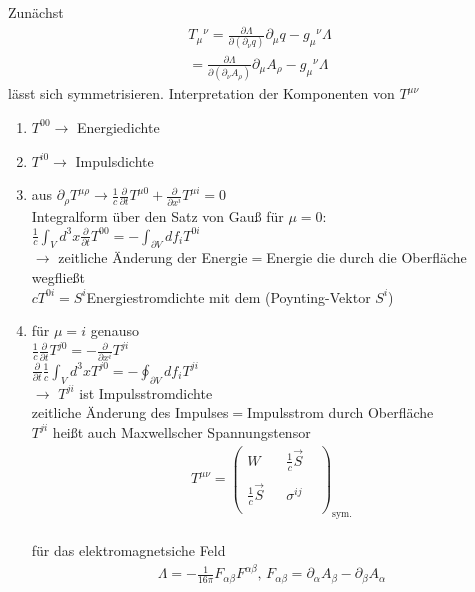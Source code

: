 \documentclass[a4paper]{article}
\begin{document}
Zunächst 
\begin{align}
T_\mu{}^\nu=\frac{\partial \Lambda}{\partial(\partial_\nu q)}\partial_\mu
q-g_\mu{}^\nu\Lambda\\
=\frac{\partial \Lambda}{\partial(\partial_\nu A_\rho)}\partial_\mu
A_\rho-g_\mu{}^\nu\Lambda
\end{align}
lässt sich symmetrisieren.
Interpretation der Komponenten von $T^{\mu\nu}$
\begin{enumerate}
  \item $T^{00} \rightarrow$ Energiedichte
  \item $T^{i0} \rightarrow$ Impulsdichte
  \item aus $\partial_\rho T^{\mu\rho} \rightarrow
  \frac{1}{c}\frac{\partial}{\partial t} T^{\mu 0}+\frac{\partial}{\partial
  x^i} T^{\mu i}=0$ \\ Integralform über den Satz von Gauß für $\mu=0$:\\
  $\frac{1}{c}\int_V d^3x \frac{\partial}{\partial t} T^{0 0}=-\int_{\partial
  V} df_i T^{0i}$ \\ $\rightarrow$ zeitliche Änderung der Energie$=$Energie die
  durch die Oberfläche wegfließt\\ $cT^{0i}=S^i$Energiestromdichte mit dem
  (Poynting-Vektor $S^i$)
  \item für $\mu=i$ genauso \\ $\frac{1}{c}\frac{\partial}{\partial t}
  T^{j0}=-\frac{\partial}{\partial x^i} T^{ji}$\\ $\frac{\partial}{\partial
  t}\frac{1}{c}\int_Vd^3x T^{j0}=-\oint_{\partial V}df_i T^{ji}$\\$\rightarrow$
  $T^{ji}$ ist Impulsstromdichte\\zeitliche Änderung des Impulses$=$Impulsstrom
  durch Oberfläche \\ $T^{ji}$ heißt auch Maxwellscher Spannungstensor
  \begin{align}
  T^{\mu\nu}=\begin{pmatrix}W&&\frac{1}{c}\vec{S}&\\&&&\\
  \frac{1}{c}\vec{S}&&\sigma^{ij}&\\&&&\end{pmatrix}_{\text{sym.}}
  \end{align}\\ für das elektromagnetsiche Feld \begin{align}
  \Lambda =-\frac{1}{16\pi}F_{\alpha\beta}F^{\alpha\beta} \text{,   }
  F_{\alpha\beta}=\partial_\alpha A_\beta-\partial_\beta A_\alpha \\

\end{align}
\end{enumerate}
\end{document}
